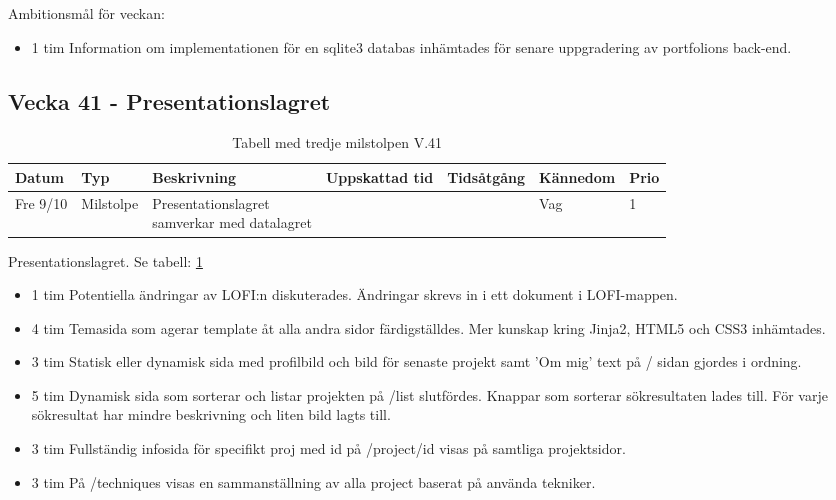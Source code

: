 \documentclass{TDP003mall}
\begin{document}
Ambitionsmål för veckan:
\begin{itemize}
\item 1 tim Information om implementationen för en sqlite3 databas inhämtades för senare uppgradering av portfolions back-end.
  \end{itemize}


  
  \subsection*{Vecka 41 - Presentationslagret}
  \begin{table}[h!]
          \caption{Tabell med tredje milstolpen V.41\label{tab:6}}            
  \begin{tabularx}{\linewidth}{|l|l|X|l|l|l|l|}
  \hline
  Datum          & Typ       & Beskrivning                                                  & Uppskattad tid & Tidsåtgång & Kännedom & Prio \\ [0.5ex]
  \hline                                             
        Fre 9/10 & Milstolpe & \makecell[tl]{Presentationslagret \\samverkar med datalagret} &                &            & Vag      & 1 \\
    \hline
  \end{tabularx}
        \end{table}
        
Presentationslagret. Se tabell: \ref{tab:6}
\begin{itemize}
  \item 1 tim Potentiella ändringar av LOFI:n diskuterades. Ändringar skrevs in i ett dokument i LOFI-mappen.
  \item 4 tim Temasida som agerar template åt alla andra sidor färdigställdes. Mer kunskap kring Jinja2, HTML5 och CSS3 inhämtades.
  \item 3 tim Statisk eller dynamisk sida med profilbild och bild för senaste projekt samt 'Om mig' text på / sidan gjordes i ordning.
  \item 5 tim Dynamisk sida som sorterar och listar projekten på /list slutfördes. Knappar som sorterar sökresultaten lades till. För varje sökresultat har mindre beskrivning och liten bild lagts till.                  
  \item 3 tim Fullständig infosida för specifikt proj med id på /project/id visas på samtliga projektsidor.
  \item 3 tim På /techniques visas en sammanställning av alla project baserat på använda tekniker.
\end{itemize}
\end{document}
